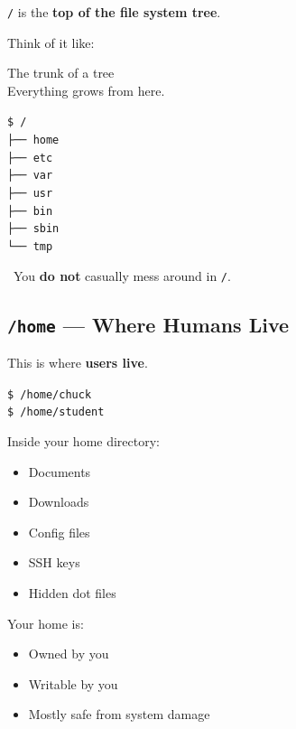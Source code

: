 \documentclass[12pt]{article}
\newcommand{\treeicon}{\faTree}
\newcommand{\warningicon}{\faExclamationTriangle}
\begin{document}
\texttt{/} is the \textbf{top of the file system tree}.

Think of it like:

\begin{infobox}
The trunk of a tree \treeicon\\
Everything grows from here.
\end{infobox}

\begin{highlightbox}
\texttt{\$ /}\\
\texttt{├── home}\\
\texttt{├── etc}\\
\texttt{├── var}\\
\texttt{├── usr}\\
\texttt{├── bin}\\
\texttt{├── sbin}\\
\texttt{└── tmp}
\end{highlightbox}

\begin{warningbox}
\warningicon\ You \textbf{do not} casually mess around in \texttt{/}.
\end{warningbox}

\subsection*{\texttt{/home} — Where Humans Live}

This is where \textbf{users live}.

\begin{highlightbox}
\texttt{\$ /home/chuck}\\
\texttt{\$ /home/student}
\end{highlightbox}

Inside your home directory:

\begin{itemize}
    \item Documents
    \item Downloads
    \item Config files
    \item SSH keys
    \item Hidden dot files
\end{itemize}

Your home is:

\begin{itemize}
    \item Owned by you
    \item Writable by you
    \item Mostly safe from system damage
\end{itemize}
\end{document}
